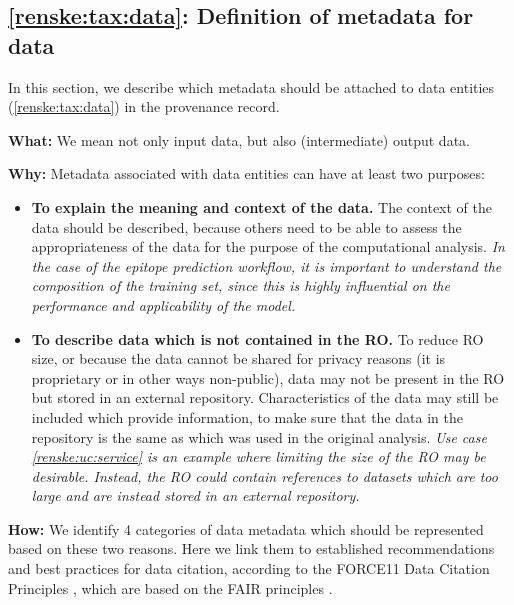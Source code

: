 \subsection{\ref{renske:tax:data}: Definition of metadata for data}
\label{sec:renske:data_reqs}

In this section, we describe which metadata should be attached to data entities (\ref{renske:tax:data}) in the provenance record. 

\textbf{What:} We mean not only input data, but also (intermediate) output data.

\textbf{Why:} Metadata associated with data entities can have at least two purposes:
\begin{itemize}
    \item \textbf{To explain the meaning and context of the data.} The context of the data should be described, because others need to be able to assess the appropriateness of the data for the purpose of the computational analysis. \textit{In the case of the epitope prediction workflow, it is important to understand the composition of the training set, since this is highly influential on the performance and applicability of the model.}
    \item \textbf{To describe data which is not contained in the RO.} To reduce RO size, or because the data cannot be shared for privacy reasons (it is proprietary or in other ways non-public), data may not be present in the RO but stored in an external repository. Characteristics of the data may still be included which provide information, to make sure that the data in the repository is the same as which was used in the original analysis. \textit{Use case \ref{renske:uc:service} is an example where limiting the size of the RO may be desirable. Instead, the RO could contain references to datasets which are too large and are instead stored in an external repository.}
\end{itemize}

\textbf{How:} We identify 4 categories of data metadata which should be represented based on these two reasons. Here we link them to established recommendations and best practices for data citation, according to the FORCE11 Data Citation Principles \cite{datacitationsynthesisgroupJointDeclarationData2014}, which are based on the FAIR principles \cite{wilkinsonFAIRGuidingPrinciples2016}.

